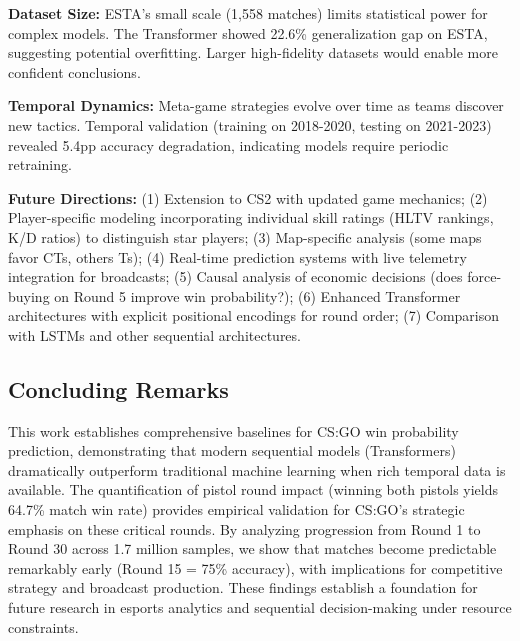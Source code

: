\documentclass[10pt,twocolumn]{article}
\begin{document}
\textbf{Dataset Size:} ESTA's small scale (1,558 matches) limits statistical power for complex models. The Transformer showed 22.6\% generalization gap on ESTA, suggesting potential overfitting. Larger high-fidelity datasets would enable more confident conclusions.

\textbf{Temporal Dynamics:} Meta-game strategies evolve over time as teams discover new tactics. Temporal validation (training on 2018-2020, testing on 2021-2023) revealed 5.4pp accuracy degradation, indicating models require periodic retraining.

\textbf{Future Directions:} (1) Extension to CS2 with updated game mechanics; (2) Player-specific modeling incorporating individual skill ratings (HLTV rankings, K/D ratios) to distinguish star players; (3) Map-specific analysis (some maps favor CTs, others Ts); (4) Real-time prediction systems with live telemetry integration for broadcasts; (5) Causal analysis of economic decisions (does force-buying on Round 5 improve win probability?); (6) Enhanced Transformer architectures with explicit positional encodings for round order; (7) Comparison with LSTMs and other sequential architectures.

\subsection{Concluding Remarks}

This work establishes comprehensive baselines for CS:GO win probability prediction, demonstrating that modern sequential models (Transformers) dramatically outperform traditional machine learning when rich temporal data is available. The quantification of pistol round impact (winning both pistols yields 64.7\% match win rate) provides empirical validation for CS:GO's strategic emphasis on these critical rounds. By analyzing progression from Round 1 to Round 30 across 1.7 million samples, we show that matches become predictable remarkably early (Round 15 = 75\% accuracy), with implications for competitive strategy and broadcast production. These findings establish a foundation for future research in esports analytics and sequential decision-making under resource constraints.
\end{document}

